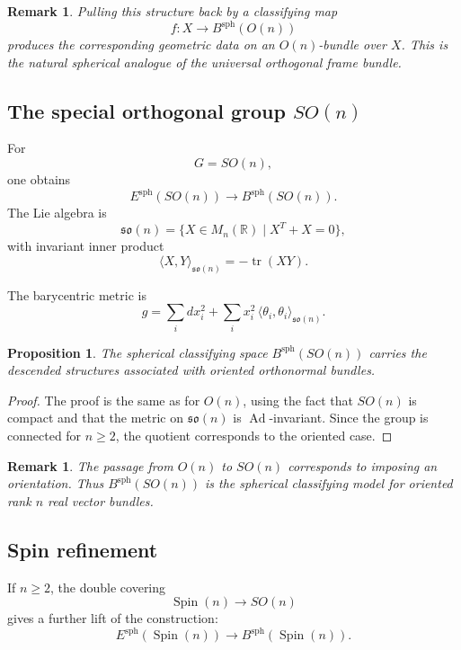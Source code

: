 \documentclass[11pt]{amsart}
\newtheorem{proposition}[theorem]{Proposition}
\newtheorem{remark}[theorem]{Remark}
\begin{document}
\begin{remark}
Pulling this structure back by a classifying map
\[
f:X\to B^{\mathrm{sph}}(O(n))
\]
produces the corresponding geometric data on an \(O(n)\)-bundle over \(X\). This is the natural spherical analogue of the universal orthogonal frame bundle.
\end{remark}

\subsection{The special orthogonal group \(SO(n)\)}

For
\[
G=SO(n),
\]
one obtains
\[
E^{\mathrm{sph}}(SO(n))
\to
B^{\mathrm{sph}}(SO(n)).
\]
The Lie algebra is
\[
\mathfrak{so}(n)=\{X\in M_n(\mathbb R)\mid X^T+X=0\},
\]
with invariant inner product
\[
\langle X,Y\rangle_{\mathfrak{so}(n)}
=
-\operatorname{tr}(XY).
\]

The barycentric metric is
\[
g
=
\sum_i dx_i^2
+
\sum_i x_i^2\,\langle \theta_i,\theta_i\rangle_{\mathfrak{so}(n)}.
\]

\begin{proposition}
The spherical classifying space \(B^{\mathrm{sph}}(SO(n))\) carries the descended structures associated with oriented orthonormal bundles.
\end{proposition}

\begin{proof}
The proof is the same as for \(O(n)\), using the fact that \(SO(n)\) is compact and that the metric on \(\mathfrak{so}(n)\) is \(\operatorname{Ad}\)-invariant. Since the group is connected for \(n\geq2\), the quotient corresponds to the oriented case.
\end{proof}

\begin{remark}
The passage from \(O(n)\) to \(SO(n)\) corresponds to imposing an orientation. Thus \(B^{\mathrm{sph}}(SO(n))\) is the spherical classifying model for oriented rank \(n\) real vector bundles.
\end{remark}

\subsection{Spin refinement}

If \(n\geq2\), the double covering
\[
\operatorname{Spin}(n)\longrightarrow SO(n)
\]
gives a further lift of the construction:
\[
E^{\mathrm{sph}}(\operatorname{Spin}(n))
\to
B^{\mathrm{sph}}(\operatorname{Spin}(n)).
\]
\end{document}
